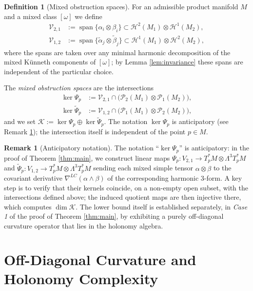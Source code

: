 \documentclass[11pt,reqno]{amsart}
\theoremstyle{plain}
\theoremstyle{definition}
\newtheorem{definition}[theorem]{Definition}
\newtheorem{remark}[theorem]{Remark}
\numberwithin{equation}{section}
\begin{document}
\begin{definition}[Mixed obstruction spaces]\label{def:obstruction}
For an admissible product manifold $M$ and a mixed class $[\omega]$ we define
\begin{align*}
\mathcal{V}_{2,1}&:=\operatorname{span}\{\alpha_i\otimes\beta_i\}\subset
\mathcal{H}^2(M_1)\otimes\mathcal{H}^1(M_2),\\[2pt]
\mathcal{V}_{1,2}&:=\operatorname{span}\{\tilde\alpha_j\otimes\tilde\beta_j\}\subset
\mathcal{H}^1(M_1)\otimes\mathcal{H}^2(M_2),
\end{align*}
where the spans are taken over any minimal harmonic decomposition of the mixed Künneth 
components of $[\omega]$; by Lemma \ref{lem:invariance} these spans are independent of the 
particular choice.

The \emph{mixed obstruction spaces} are the intersections
\begin{align*}
\ker\Psi_p&:=\mathcal{V}_{2,1}\cap\bigl(\mathcal{P}_2(M_1)\otimes\mathcal{P}_1(M_2)\bigr),\\[2pt]
\ker\widetilde{\Psi}_p&:=\mathcal{V}_{1,2}\cap\bigl(\mathcal{P}_1(M_1)\otimes\mathcal{P}_2(M_2)\bigr),
\end{align*}
and we set \(\mathcal{K}:=\ker\Psi_p\oplus\ker\widetilde{\Psi}_p\).
The notation $\ker\Psi_p$ is anticipatory (see Remark \ref{rem:anticipatory_notation}); the intersection itself is independent of the point $p\in M$.
\end{definition}

\begin{remark}[Anticipatory notation]
\label{rem:anticipatory_notation}
The notation ``$\ker \Psi_p$'' is anticipatory: in the proof of Theorem \ref{thm:main}, we construct linear maps $\Psi_p : V_{2,1} \to T_p^*M\otimes\Lambda^3 T_p^*M$ and
$\widetilde{\Psi}_p : V_{1,2} \to T_p^*M\otimes\Lambda^3 T_p^*M$ sending each mixed simple tensor $\alpha\otimes\beta$ to the covariant derivative $\nabla^{LC}(\alpha\wedge\beta)$ of the corresponding harmonic $3$-form. A key step is to verify that their kernels coincide, on a non-empty open subset, with the intersections defined above; the induced quotient maps are then injective there, which computes $\dim\mathcal{K}$. The lower bound itself is established separately, in \emph{Case 1} of the proof of Theorem \ref{thm:main}, by exhibiting a purely off-diagonal curvature operator that lies in the holonomy algebra.
\end{remark}


\section{Off-Diagonal Curvature and Holonomy Complexity}
\end{document}
